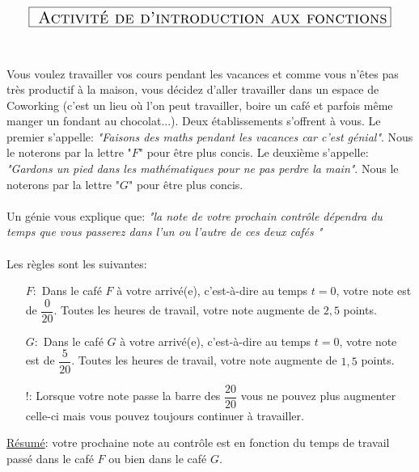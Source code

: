 \documentclass[a4paper,11pt]{article}
\theoremstyle{definition}
\begin{document}
	
\chead{}\renewcommand{\headrulewidth}{0.4pt}\renewcommand{\footrulewidth}{0.4pt}

\hfill\\[-0.7cm]
$$	\fbox{\text{\Large{ \sc Activité de d'introduction aux fonctions}}}$$

\hfill\\



	\par Vous voulez travailler vos cours pendant les vacances et comme vous n'êtes pas très productif à la maison, vous décidez d'aller travailler dans un espace de Coworking (c'est un lieu où l'on peut travailler, boire un café et parfois même manger un fondant au chocolat...). Deux établissements s'offrent à vous. Le premier s'appelle: \textit{"Faisons des maths pendant les vacances car c'est génial"}. Nous le noterons par la lettre "$F$" pour être plus concis.
	Le deuxième s'appelle: \textit{"Gardons un pied dans les mathématiques pour ne pas perdre la main"}. Nous le noterons par la lettre "$G$" pour être plus concis.\\\\
	Un génie vous explique que: \textit{"la note de votre prochain contrôle dépendra du temps que vous passerez dans l'un ou l'autre de ces deux cafés "}\\\\
	Les règles sont les suivantes:
	\begin{itemize}
		\item[$F:$] Dans le café $F$ à votre arrivé(e), c'est-à-dire au temps $t=0$, votre note est de $\dfrac{0}{20}$. Toutes les heures de travail, votre note augmente de $2,5$ points. 
		\item[$G:$] Dans le café $G$ à votre arrivé(e), c'est-à-dire au temps $t=0$, votre note est de $\dfrac{5}{20}$. Toutes les heures de travail, votre note augmente de $1,5$ points.
		\item [!:] Lorsque votre note passe la barre des $\dfrac{20}{20}$ vous ne pouvez plus augmenter celle-ci mais vous pouvez toujours continuer à travailler.\\
	\end{itemize}
	 
	\noindent\underline{Résumé}: votre prochaine note au contrôle est en fonction du temps de travail passé dans le café $F$ ou bien dans le café $G$.\\
	
\end{document}

